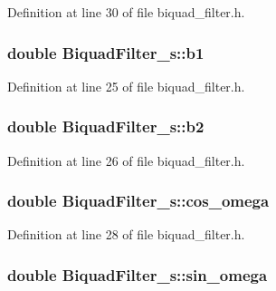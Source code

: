 Definition at line 30 of file biquad\+\_\+filter.\+h.

\subsubsection[{\texorpdfstring{b1}{b1}}]{\setlength{\rightskip}{0pt plus 5cm}double Biquad\+Filter\+\_\+s\+::b1}\hypertarget{struct_biquad_filter__s_ab63761542af0c3f5125b0db0fd916bac}{}\label{struct_biquad_filter__s_ab63761542af0c3f5125b0db0fd916bac}


Definition at line 25 of file biquad\+\_\+filter.\+h.

\subsubsection[{\texorpdfstring{b2}{b2}}]{\setlength{\rightskip}{0pt plus 5cm}double Biquad\+Filter\+\_\+s\+::b2}\hypertarget{struct_biquad_filter__s_a828654a21d4b032c1293c415126d323b}{}\label{struct_biquad_filter__s_a828654a21d4b032c1293c415126d323b}


Definition at line 26 of file biquad\+\_\+filter.\+h.

\subsubsection[{\texorpdfstring{cos\+\_\+omega}{cos_omega}}]{\setlength{\rightskip}{0pt plus 5cm}double Biquad\+Filter\+\_\+s\+::cos\+\_\+omega}\hypertarget{struct_biquad_filter__s_a0f39a79d9bc160279be36b217878c689}{}\label{struct_biquad_filter__s_a0f39a79d9bc160279be36b217878c689}


Definition at line 28 of file biquad\+\_\+filter.\+h.

\subsubsection[{\texorpdfstring{sin\+\_\+omega}{sin_omega}}]{\setlength{\rightskip}{0pt plus 5cm}double Biquad\+Filter\+\_\+s\+::sin\+\_\+omega}\hypertarget{struct_biquad_filter__s_a7d784cea5e8756f4debb97f7e7e99893}{}\label{struct_biquad_filter__s_a7d784cea5e8756f4debb97f7e7e99893}



